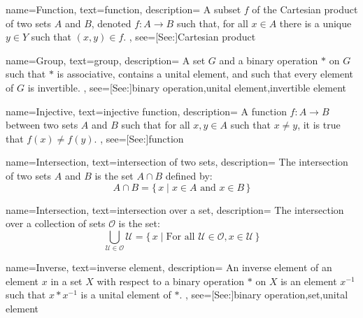 {
    name={Function},
    text={function},
    description={
        A subset $f$ of the Cartesian product of two sets $A$ and $B$,
        denoted $f:A\rightarrow{B}$ such that, for all $x\in{A}$ there is
        a unique $y\in{Y}$ such that $(x,y)\in{f}$.
    },
    see=[See:]{Cartesian product}
}

{
    name={Group},
    text={group},
    description={
        A set $G$ and a binary operation $*$ on $G$ such that
        $*$ is associative, contains a unital element, and such that
        every element of $G$ is invertible.
    },
    see=[See:]{binary operation,unital element,invertible element}
}

{
    name={Injective},
    text={injective function},
    description={
        A function $f:A\rightarrow{B}$ between two sets $A$ and $B$ such
        that for all $x,y\in{A}$ such that $x\ne{y}$, it is true that
        $f(x)\ne{f}(y)$.
    },
    see=[See:]{function}
}

{
    name={Intersection},
    text={intersection of two sets},
    description={
        The intersection of two sets $A$ and $B$ is the set $A\cap{B}$
        defined by:
        \begin{equation*}
            A\cap{B}=\big\{\,x\;|\;x\in{A}\textrm{ and }x\in{B}\,\big\}
        \end{equation*}
    }
}

{
    name={Intersection},
    text={intersection over a set},
    description={
        The intersection over a collection of sets $\mathcal{O}$ is the set:
        \begin{equation*}
            \bigcup_{\mathcal{U}\in\mathcal{O}}\mathcal{U}
            =\big\{\,x\;|\;\textrm{For all }\mathcal{U}\in\mathcal{O},
                x\in\mathcal{U}\,\big\}
        \end{equation*}
    }
}

{
    name={Inverse},
    text={inverse element},
    description={
        An inverse element of an element $x$ in a set $X$ with respect to a
        binary operation $*$ on $X$ is an element $x^{\minus{1}}$ such that
        $x*x^{\minus{1}}$ is a unital element of $*$.
    },
    see=[See:]{binary operation,set,unital element}
}

